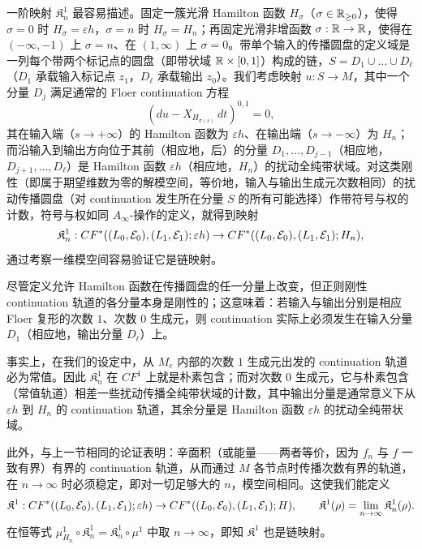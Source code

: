 一阶映射 $\mathfrak{K}_n^1$ 最容易描述。固定一簇光滑 Hamilton 函数 $H_\sigma$（$\sigma\in\mathbb{R}_{\geq 0}$），使得 $\sigma=0$ 时 $H_\sigma=\varepsilon h$，$\sigma=n$ 时 $H_\sigma=H_n$；再固定光滑非增函数 $\sigma:\mathbb{R}\to\mathbb{R}$，使得在 $(-\infty,-1)$ 上 $\sigma=n$、在 $(1,\infty)$ 上 $\sigma=0$。带单个输入的传播圆盘的定义域是一列每个带两个标记点的圆盘（即带状域 $\mathbb{R}\times[0,1]$）构成的链，$S=D_1\cup\dots\cup D_\ell$（$D_1$ 承载输入标记点 $z_1$，$D_\ell$ 承载输出 $z_0$）。我们考虑映射 $u:S\to M$，其中一个分量 $D_j$ 满足通常的 Floer continuation 方程
\[
(du-X_{H_{\sigma(s)}}\,dt)^{0,1}=0,
\]
其在输入端（$s\to+\infty$）的 Hamilton 函数为 $\varepsilon h$、在输出端（$s\to-\infty$）为 $H_n$；而沿输入到输出方向位于其前（相应地，后）的分量 $D_1,\dots,D_{j-1}$（相应地，$D_{j+1},\dots,D_\ell$）是 Hamilton 函数 $\varepsilon h$（相应地，$H_n$）的扰动全纯带状域。对这类刚性（即属于期望维数为零的解模空间，等价地，输入与输出生成元次数相同）的扰动传播圆盘（对 continuation 发生所在分量 $S$ 的所有可能选择）作带符号与权的计数，符号与权如同 $A_\infty$-操作的定义，就得到映射
\[
\mathfrak{K}_n^1:CF^*((L_0,\mathcal{E}_0),(L_1,\mathcal{E}_1);\varepsilon h)\to
CF^*((L_0,\mathcal{E}_0),(L_1,\mathcal{E}_1);H_n),
\]
通过考察一维模空间容易验证它是链映射。

\begin{remark}\label{rmk:continuation}
尽管定义允许 Hamilton 函数在传播圆盘的任一分量上改变，但正则刚性 continuation 轨道的各分量本身是刚性的；这意味着：若输入与输出分别是相应 Floer 复形的次数 $1$、次数 $0$ 生成元，则 continuation 实际上必须发生在输入分量 $D_1$（相应地，输出分量 $D_\ell$）上。

事实上，在我们的设定中，从 $M_e$ 内部的次数 $1$ 生成元出发的 continuation 轨道必为常值。因此 $\mathfrak{K}_n^1$ 在 $CF^1$ 上就是朴素包含；而对次数 $0$ 生成元，它与朴素包含（常值轨道）相差一些扰动传播全纯带状域的计数，其中输出分量是通常意义下从 $\varepsilon h$ 到 $H_n$ 的 continuation 轨道，其余分量是 Hamilton 函数 $\varepsilon h$ 的扰动全纯带状域。
\end{remark}

此外，与上一节相同的论证表明：辛面积（或能量——两者等价，因为 $f_n$ 与 $f$ 一致有界）有界的 continuation 轨道，从而通过 $M$ 各节点时传播次数有界的轨道，在 $n\to\infty$ 时必须稳定，即对一切足够大的 $n$，模空间相同。这使我们能定义
\[
\mathfrak{K}^1:CF^*((L_0,\mathcal{E}_0),(L_1,\mathcal{E}_1);\varepsilon h)\to
CF^*((L_0,\mathcal{E}_0),(L_1,\mathcal{E}_1);H),\qquad
\mathfrak{K}^1(\rho)=\lim_{n\to\infty}\mathfrak{K}^1_n(\rho).
\]
在恒等式 $\mu^1_{H_n}\circ\mathfrak{K}^1_n=\mathfrak{K}^1_n\circ\mu^1$ 中取 $n\to\infty$，即知 $\mathfrak{K}^1$ 也是链映射。

